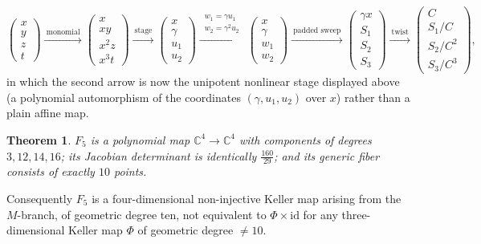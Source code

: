 \documentclass[11pt]{article}
\theoremstyle{plain}
\newtheorem{theorem}{Theorem}[section]
\theoremstyle{definition}
\theoremstyle{remark}
\newcommand{\C}{\mathbb{C}}
\begin{document}
\[
\begin{pmatrix}x\\ y\\ z\\ t\end{pmatrix}
\xrightarrow{\ \text{monomial}\ }
\begin{pmatrix}x\\ xy\\ x^2z\\ x^3t\end{pmatrix}
\xrightarrow{\ \text{stage}\ }
\begin{pmatrix}x\\ \gamma\\ u_1\\ u_2\end{pmatrix}
\xrightarrow{\ \substack{w_1=\gamma u_1\\[1pt] w_2=\gamma^2u_2}\ }
\begin{pmatrix}x\\ \gamma\\ w_1\\ w_2\end{pmatrix}
\xrightarrow{\ \text{padded sweep}\ }
\begin{pmatrix}\gamma x\\ S_1\\ S_2\\ S_3\end{pmatrix}
\xrightarrow{\ \text{twist}\ }
\begin{pmatrix}C\\ S_1/C\\ S_2/C^2\\ S_3/C^3\end{pmatrix},
\]
in which the second arrow is now the unipotent nonlinear stage displayed above
(a polynomial automorphism of the coordinates $(\gamma,u_1,u_2)$ over $x$)
rather than a plain affine map.

\begin{theorem}\label{thm:F5}
$F_5$ is a polynomial map $\C^4\to\C^4$ with components of degrees $3,12,14,16$;
its Jacobian determinant is identically $\tfrac{160}{29}$; and its generic fiber
consists of exactly $10$ points.
\end{theorem}

Consequently $F_5$ is a four-dimensional
non-injective Keller map arising from the $M$-branch, of geometric degree ten,
not equivalent to $\Phi\times\mathrm{id}$ for any three-dimensional Keller map
$\Phi$ of geometric degree $\neq10$.
\end{document}
